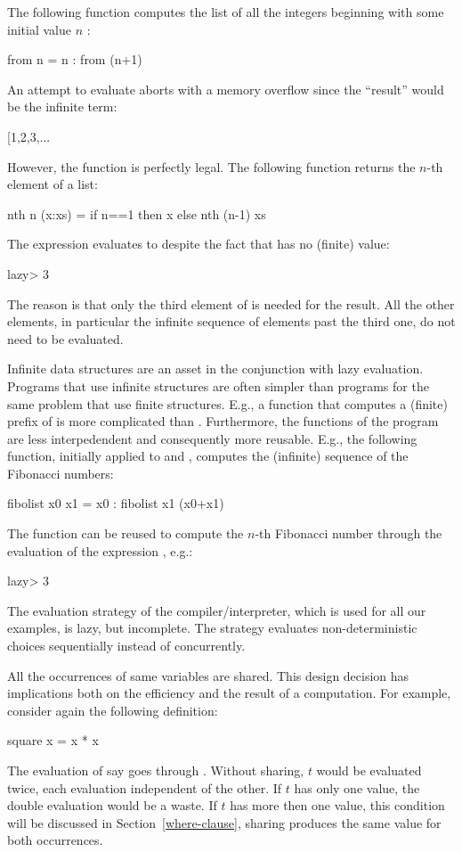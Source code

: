 The following function computes the list of
all the integers beginning with some initial value $n$
:
%
\begin{prog}
from n = n : from (n+1)
\end{prog}
%
An attempt to evaluate  aborts with a
memory overflow since the ``result'' would be the infinite term:
%
\begin{prog}
[1,2,3,...
\end{prog}
%
However, the function  is perfectly legal.
The following function returns the $n$-th element of a list:
%
\begin{prog}
nth n (x:xs) = if n==1 then x else nth (n-1) xs
\end{prog}
%
The expression  evaluates to 
despite the fact that  has no (finite) value:
%
\begin{prog}
lazy> 
3
\end{prog}
%
The reason is that only the third element of  
is needed for the result.
All the other elements, in particular the infinite sequence
of elements past the third one, do not need to be evaluated.

Infinite data structures
are an asset in the conjunction with lazy evaluation.
Programs that use infinite structures are often simpler
than programs for the same problem that use finite structures.
E.g., a function that computes a (finite) prefix of \ccode{[1,2,3,...}
is more complicated than .
Furthermore, the functions of the program are less interpedendent
and consequently more reusable.
E.g., the following function, initially applied to
 and , computes the (infinite) sequence of
the Fibonacci numbers:
%
\begin{prog}
fibolist x0 x1 = x0 : fibolist x1 (x0+x1)
\end{prog}
%
The function  can be reused to compute the $n$-th
Fibonacci number through the evaluation of the expression
, e.g.:
%
\begin{prog}
lazy> 
3
\end{prog}
%
The evaluation strategy of the \pakcs{} compiler/interpreter,
which is used for all our examples, is lazy, but incomplete.
The strategy evaluates non-deterministic choices sequentially instead
of concurrently.

All the occurrences of same variables are shared.
This design decision has implications both on the efficiency
and the result of a computation.
For example, consider again the following definition:
%
\begin{prog}
square x = x * x
\end{prog}
%
The evaluation of say  goes through
.  Without sharing, $t$ would be evaluated
twice, each evaluation independent of the other.
If $t$ has only one value, the double evaluation
would be a waste.
If $t$ has more then one value, this condition will be
discussed in Section~\ref{where-clause},
sharing produces the same value for both occurrences.

